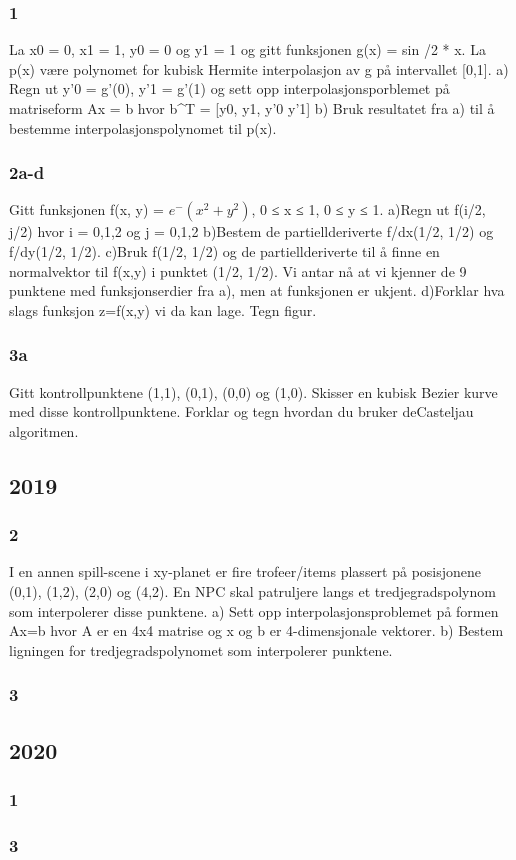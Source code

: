 \documentclass[a4paper,norsk]{article}
\begin{document}
\subsubsection{1}
La x0 = 0, x1 = 1, y0 = 0 og y1 = 1 og gitt funksjonen g(x) = sin \pi/2 * x. La p(x)
være polynomet for kubisk Hermite interpolasjon av g på intervallet [0,1].
a) Regn ut y'0 = g'(0), y'1 = g'(1) og sett opp interpolasjonsporblemet på matriseform Ax = b hvor b^T = [y0, y1,  y'0 y'1]
b) Bruk resultatet fra a) til å bestemme interpolasjonspolynomet til p(x).
\subsubsection{2a-d}
Gitt funksjonen f(x, y) = \(e^−(x^2+y^2)\), 0 ≤ x ≤ 1, 0 ≤ y ≤ 1.
a)Regn ut f(i/2, j/2) hvor i = 0,1,2 og j = 0,1,2
b)Bestem de partiellderiverte f/dx(1/2, 1/2) og f/dy(1/2, 1/2).
c)Bruk f(1/2, 1/2) og de partiellderiverte til å finne en normalvektor til f(x,y) i punktet (1/2, 1/2).
Vi antar nå at vi kjenner de 9 punktene med funksjonserdier fra a), men at funksjonen er ukjent.
d)Forklar hva slags funksjon z=f(x,y) vi da kan lage. Tegn figur.
\subsubsection{3a}
Gitt kontrollpunktene (1,1), (0,1), (0,0) og (1,0). Skisser en kubisk Bezier
kurve med disse kontrollpunktene. Forklar og tegn hvordan du bruker
deCasteljau algoritmen.
\subsection{2019}
\subsubsection{2}
I en annen spill-scene i xy-planet er fire trofeer/items plassert på posisjonene (0,1), (1,2), (2,0) og (4,2). En NPC skal patruljere langs et tredjegradspolynom som interpolerer disse punktene.
a) Sett opp interpolasjonsproblemet på formen Ax=b hvor A er en 4x4
matrise og x og b er 4-dimensjonale vektorer.
b) Bestem ligningen for tredjegradspolynomet som interpolerer punktene.
\subsubsection{3}

\subsection{2020}
\subsubsection{1}

\subsubsection{3}
\end{document}
